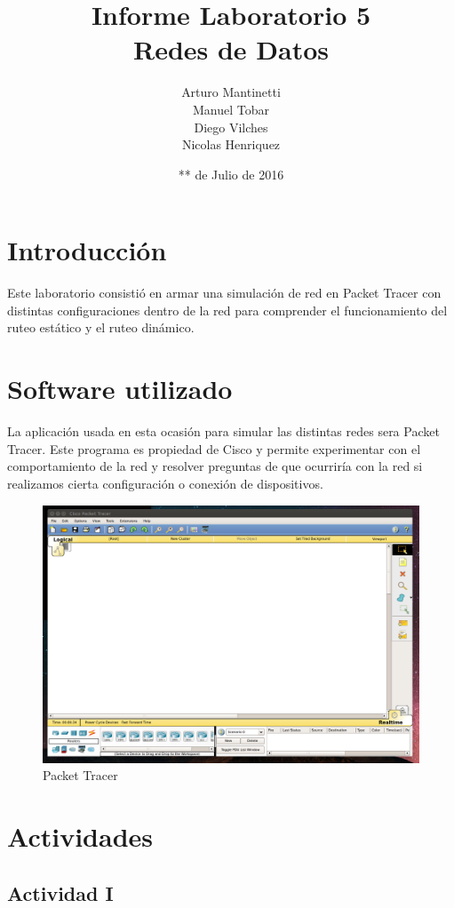 ﻿\documentclass[spanish]{udpreport}
\title{Informe Laboratorio 5 \\ Redes de Datos}
\author{Arturo Mantinetti \\ Manuel Tobar \\ Diego Vilches \\ Nicolas Henriquez}
\date{** de Julio de 2016}
\begin{document}
\maketitle

\tableofcontents

\chapter{Introducción}

Este laboratorio consistió en armar una simulación de red en Packet Tracer con distintas configuraciones dentro de la red para comprender el funcionamiento del ruteo estático y el ruteo dinámico.

\chapter{Software utilizado}
La aplicación usada en esta ocasión para simular las distintas redes sera Packet Tracer. Este programa es propiedad de Cisco y permite experimentar con el comportamiento de la red y resolver preguntas de que ocurriría con la red si realizamos cierta configuración o conexión de dispositivos.

\begin{figure}[H]
	\centering
	\includegraphics[scale=.25]{imagenes/A0e.png}
	\caption{Packet Tracer}
	\label{fig:Figura 1.1}
\end{figure}


\chapter{Actividades}

\section{Actividad I}
\end{document}
